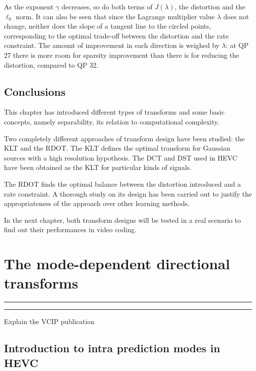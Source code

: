 \documentclass[11pt,a4paper,openright,twoside]{book}
\providecommand{\chaptertoc}{
	\startcontents[chapters]
	\hrule
	\vspace{1em}
	\printcontents[chapters]{}{1}{{\bf\large Contents}}
	\hrule
}
\numberwithin{equation}{section} %
\begin{document}
As the exponent $\gamma$ decreases, so do both terms of $J(\lambda)$,
the distortion and the $\ell_0$ norm.
It can also be seen that since the Lagrange multiplier value $\lambda$
does not change, neither does the slope of a tangent line to the circled
points, corresponding to the optimal trade-off between the distortion
and the rate constraint.
The amount of improvement in each direction is weighed by $\lambda$: at
\ac{QP} 27 there is more room for sparsity improvement than there is for
reducing the distortion, compared to \ac{QP} 32.

\section{Conclusions}
\label{sec:conclusions_transforms}

This chapter has introduced different types of transforms and some
basic concepts, namely separability, its relation to computational
complexity.

Two completely different approaches of transform design have been
studied: the \ac{KLT} and the \ac{RDOT}.
The \ac{KLT} defines the optimal transform for Gaussian sources with a
high resolution hypothesis.
The \ac{DCT} and \ac{DST} used in \ac{HEVC} have been obtained as the
\ac{KLT} for particular kinds of signals.

The \ac{RDOT} finds the optimal balance between the distortion
introduced and a rate constraint.
A thorough study on its design has been carried out to justify the
appropriateness of the approach over other learning methods.

In the next chapter, both transform designs will be tested in a real
scenario to find out their performances in video coding.


\chapter{The mode-dependent directional transforms}
\label{cha:the_mode_dependent_directional_transforms}
\chaptertoc

\vspace{0.5cm}
Explain the VCIP publication~\cite{arrufat-14-mddt-rdot}

\section{Introduction to intra prediction modes in \acs{HEVC}}
\label{sec:introduction_to_intra_prediction_modes_in_hevc}
\end{document}
